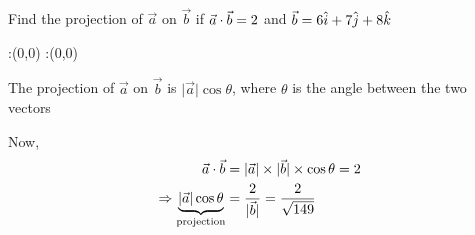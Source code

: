 


\question[1] Find the projection of $\vec{a}$ on $\vec{b}$ if $\vec{a}\cdot\vec{b} = 2$ 
and $\vec{b} = 6\hat{i} + 7\hat{j} + 8\hat{k}$ 


\watchout

\ifprintanswers
  \begin{marginfigure}
      :(0,0)
      :(0,0)
    \figdrawbegin{}
      \figdrawline [100,101]
    \figdrawend
    \figvisu{\figBoxA}{}{%
    }
    \centerline{\box\figBoxA}
  \end{marginfigure}
\fi 

\begin{solution}[\mcq]
	The projection of $\vec{a}$ on $\vec{b}$ is $\vert\vec{a}\vert\cos\theta$, where $\theta$ 
	is the angle between the two vectors
	
	Now, \begin{align}
		\vec{a}\cdot\vec{b} &= \vert\vec{a}\vert\times\vert\vec{b}\vert\times\cos\theta = 2 \\
		\Rightarrow \underbrace{\vert\vec{a}\vert\cos\theta}_{\text{projection}} 
		&= \dfrac{2}{\vert\vec{b}\vert} = \dfrac{2}{\sqrt{149}} 
	\end{align}
\end{solution}

